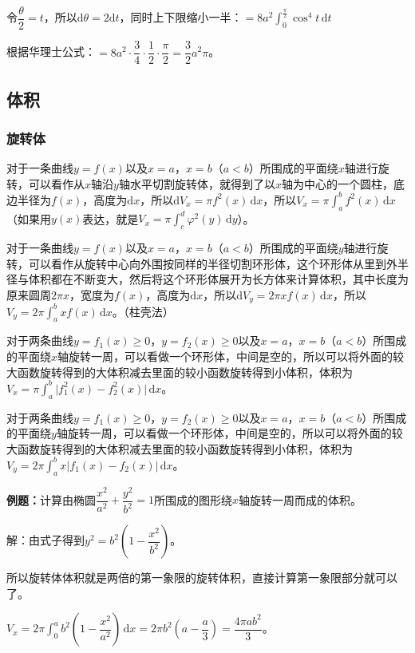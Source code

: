 \documentclass[UTF8, 12pt]{ctexart}
\begin{document}
令$\dfrac{\theta}{2}=t$，所以$\textrm{d}\theta=2\textrm{d}t$，同时上下限缩小一半：$=8a^2\int_0^{\frac{\pi}{2}}\cos^4t\,\textrm{d}t$

根据华理士公式：$=8a^2\cdot\dfrac{3}{4}\cdot\dfrac{1}{2}\cdot\dfrac{\pi}{2}=\dfrac{3}{2}a^2\pi$。

\subsection{体积}

\subsubsection{旋转体}

对于一条曲线$y=f(x)$以及$x=a$，$x=b$（$a<b$）所围成的平面绕$x$轴进行旋转，可以看作从$x$轴沿$y$轴水平切割旋转体，就得到了以$x$轴为中心的一个圆柱，底边半径为$f(x)$，高度为$\textrm{d}x$，所以$\textrm{d}V_x=\pi f^2(x)\,\textrm{d}x$，所以$V_x=\pi\int_a^bf^2(x)\,\textrm{d}x$（如果用$y(x)$表达，就是$V_x=\pi\int_c^d\varphi^2(y)\,\textrm{d}y$）。

对于一条曲线$y=f(x)$以及$x=a$，$x=b$（$a<b$）所围成的平面绕$y$轴进行旋转，可以看作从旋转中心向外围按同样的半径切割环形体，这个环形体从里到外半径与体积都在不断变大，然后将这个环形体展开为长方体来计算体积，其中长度为原来圆周$2\pi x$，宽度为$f(x)$，高度为$\textrm{d}x$，所以$\textrm{d}V_y=2\pi xf(x)\,\textrm{d}x$，所以$V_y=2\pi\int_a^bxf(x)\,\textrm{d}x$。（柱壳法）

对于两条曲线$y=f_1(x)\geqslant0$，$y=f_2(x)\geqslant0$以及$x=a$，$x=b$（$a<b$）所围成的平面绕$x$轴旋转一周，可以看做一个环形体，中间是空的，所以可以将外面的较大函数旋转得到的大体积减去里面的较小函数旋转得到小体积，体积为$V_x=\pi\int_a^b\vert f_1^2(x)-f_2^2(x)\vert\,\textrm{d}x$。

对于两条曲线$y=f_1(x)\geqslant0$，$y=f_2(x)\geqslant0$以及$x=a$，$x=b$（$a<b$）所围成的平面绕$y$轴旋转一周，可以看做一个环形体，中间是空的，所以可以将外面的较大函数旋转得到的大体积减去里面的较小函数旋转得到小体积，体积为$V_y=2\pi\int_a^bx\vert f_1(x)-f_2(x)\vert\,\textrm{d}x$。

\textbf{例题：}计算由椭圆$\dfrac{x^2}{a^2}+\dfrac{y^2}{b^2}=1$所围成的图形绕$x$轴旋转一周而成的体积。

解：由式子得到$y^2=b^2\left(1-\dfrac{x^2}{b^2}\right)$。

所以旋转体体积就是两倍的第一象限的旋转体积，直接计算第一象限部分就可以了。

$V_x=2\pi\displaystyle{\int_0^ab^2\left(1-\dfrac{x^2}{a^2}\right)\,\textrm{d}x}=2\pi b^2\left(a-\dfrac{a}{3}\right)=\dfrac{4\pi ab^2}{3}$。
\end{document}
